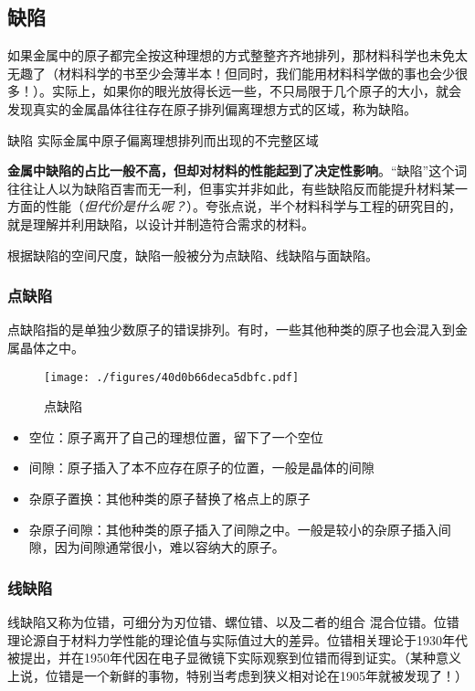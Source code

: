 \subsection{缺陷}
如果金属中的原子都完全按这种理想的方式整整齐齐地排列，那材料科学也未免太无趣了（材料科学的书至少会薄半本！但同时，我们能用材料科学做的事也会少很多！）。实际上，如果你的眼光放得长远一些，不只局限于几个原子的大小，就会发现真实的金属晶体往往存在原子排列偏离理想方式的区域，称为缺陷。

\begin{definition}{缺陷}
实际金属中原子偏离理想排列而出现的不完整区域
\end{definition}

\textbf{金属中缺陷的占比一般不高，但却对材料的性能起到了决定性影响}。“缺陷”这个词往往让人以为缺陷百害而无一利，但事实并非如此，有些缺陷反而能提升材料某一方面的性能（\textsl{但代价是什么呢？}）。夸张点说，半个材料科学与工程的研究目的，就是理解并利用缺陷，以设计并制造符合需求的材料。

根据缺陷的空间尺度，缺陷一般被分为点缺陷、线缺陷与面缺陷。

\subsubsection{点缺陷}
点缺陷指的是单独少数原子的错误排列。有时，一些其他种类的原子也会混入到金属晶体之中。
\begin{figure}[ht]
\centering
\texttt{[image: ./figures/40d0b66deca5dbfc.pdf]}
\caption{点缺陷} \label{fig_MetInt_19}
\end{figure}

\begin{itemize}
\item 空位：原子离开了自己的理想位置，留下了一个空位
\item 间隙：原子插入了本不应存在原子的位置，一般是晶体的间隙
\item 杂原子置换：其他种类的原子替换了格点上的原子
\item 杂原子间隙：其他种类的原子插入了间隙之中。一般是较小的杂原子插入间隙，因为间隙通常很小，难以容纳大的原子。
\end{itemize}

\subsubsection{线缺陷}
线缺陷又称为位错，可细分为刃位错、螺位错、以及二者的组合 混合位错。位错理论源自于材料力学性能的理论值与实际值过大的差异。位错相关理论于1930年代被提出，并在1950年代因在电子显微镜下实际观察到位错而得到证实。（某种意义上说，位错是一个新鲜的事物，特别当考虑到狭义相对论在1905年就被发现了！）

